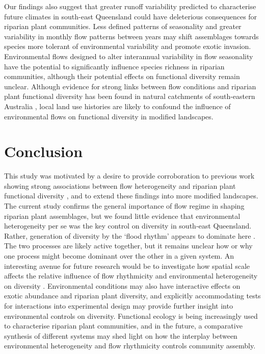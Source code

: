 \documentclass[openright,12pt,a4paper]{memoir}
\begin{document}
Our findings also suggest that greater runoff variability predicted to characterise future climates in south-east Queensland \citep{Hennessy2008} could have deleterious consequences for riparian plant communities. Less defined patterns of seasonality and greater variability in monthly flow patterns between years may shift assemblages towards species more tolerant of environmental variability and promote exotic invasion. Environmental flows designed to alter interannual variability in flow seasonality have the potential to significantly influence species richness in riparian communities, although their potential effects on functional diversity remain unclear. Although evidence for strong links between flow conditions and riparian plant functional diversity has been found in natural catchments of south-eastern Australia \citep{Lawson2015a}, local land use histories are likely to confound the influence of environmental flows on functional diversity in modified landscapes. 

\section*{Conclusion}

This study was motivated by a desire to provide corroboration to previous work showing strong associations between flow heterogeneity and riparian plant functional diversity \citep{Lawson2015a}, and to extend these findings into more modified landscapes. The current study confirms the general importance of flow regime in shaping riparian plant assemblages, but we found little evidence that environmental heterogeneity per se was the key control on diversity in south-east Queensland. Rather, generation of diversity by the ‘flood rhythm’ appears to dominate here \citep{Jardine2015}. The two processes are likely active together, but it remains unclear how or why one process might become dominant over the other in a given system. An interesting avenue for future research would be to investigate how spatial scale affects the relative influence of flow rhythmicity and environmental heterogeneity on diversity \citep{Lundholm2009}. Environmental conditions may also have interactive effects on exotic abundance and riparian plant diversity, and explicitly accommodating tests for interactions into experimental design may provide further insight into environmental controls on diversity. Functional ecology is being increasingly used to characterise riparian plant communities, and in the future, a comparative synthesis of different systems may shed light on how the interplay between environmental heterogeneity and flow rhythmicity controls community assembly.
\end{document}
